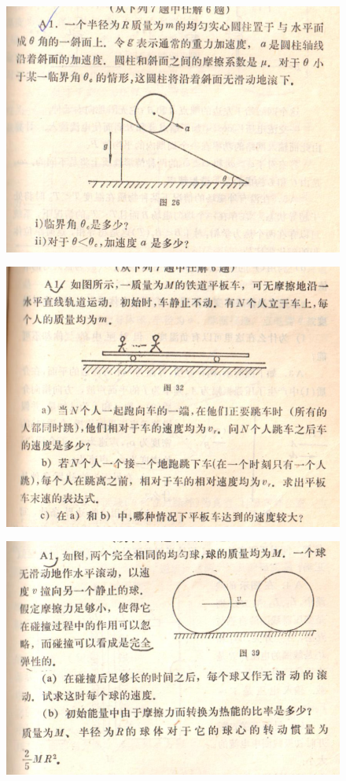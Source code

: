 \documentclass[10pt,a4paper]{article}
\begin{document}
 \newpage
\begin{figure}[H]
 \centering
 \includegraphics[width=16cm]{pdf/1-1T24.png}
\end{figure}
 \newpage
\begin{figure}[H]
 \centering
 \includegraphics[width=16cm]{pdf/1-1T25.png}
\end{figure}
 \newpage
\begin{figure}[H]
 \centering
 \includegraphics[width=16cm]{pdf/1-1T26.png}
\end{figure}
\end{document}
